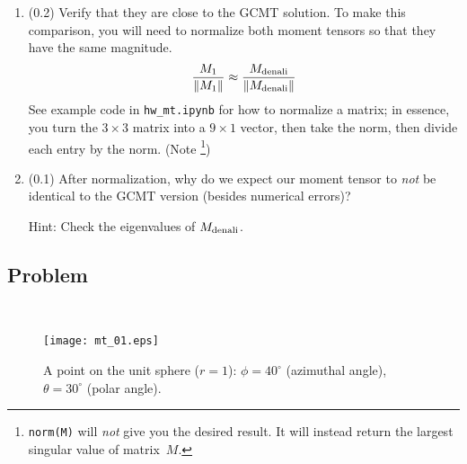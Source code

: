 \documentclass[11pt,titlepage,fleqn]{article}
\newcommand{\Mmat}{M}
\begin{document}
\begin{enumerate}
\begin{enumerate}
\item (0.2) Verify that they are close to the GCMT solution. To make this comparison, you will need to normalize both moment tensors so that they have the same magnitude.
%
\begin{equation}
\frac{\Mmat_1}{\|\Mmat_1\|} \approx \frac{\Mmat_{\rm denali} }{\|\Mmat_{\rm denali}\|}
\end{equation}
%
See example code in \verb+hw_mt.ipynb+ for how to normalize a matrix; in essence, you turn the $3 \times 3$ matrix into a $9 \times 1$ vector, then take the norm, then divide each entry by the norm. (Note \footnote{{\tt norm(M)} will {\em not} give you the desired result. It will instead return the largest singular value of matrix~$\Mmat$.})

\item (0.1) After normalization, why do we expect our moment tensor to {\em not} be identical to the GCMT version (besides numerical errors)?

Hint: Check the eigenvalues of $\Mmat_{\rm denali}$.


\end{enumerate}

\end{enumerate}


\subsection*{Problem} \howmuchtime\



\begin{figure}[h]
\centering
\texttt{[image: mt\_01.eps]}
\caption[]
{{
A point on the unit sphere ($r = 1$): $\phi = 40^\circ$ (azimuthal angle), $\theta = 30^\circ$ (polar angle).
\label{fig:globe}
}}
\end{figure}
\end{document}
